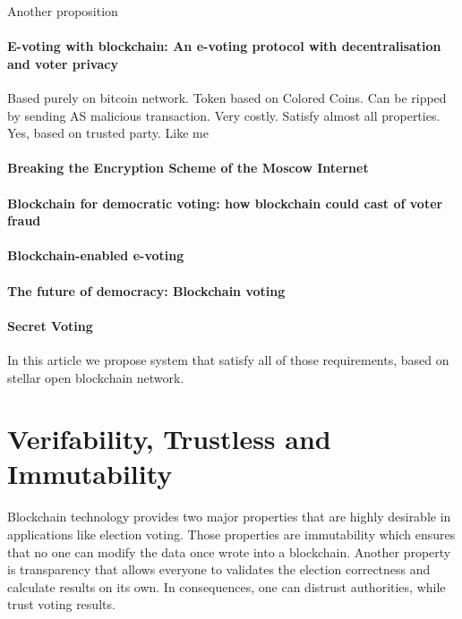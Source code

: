 \documentclass[runningheads]{llncs}
\begin{document}
Another  proposition 
\paragraph{E-voting with blockchain: An e-voting protocol with decentralisation and voter privacy ~\cite{hardwick2018voting} }
Based purely on bitcoin network. Token based on Colored Coins. Can be ripped by sending AS malicious transaction. Very costly. Satisfy almost all properties. Yes, based on trusted party. Like me

\paragraph{Breaking the Encryption Scheme of the Moscow Internet ~\cite{gaudry2019breaking} }




\paragraph{Blockchain for democratic voting: how blockchain could cast of voter fraud ~\cite{casado2018blockchain} }

\paragraph{Blockchain-enabled e-voting ~\cite{kshetri2018blockchain} }

\paragraph{The future of democracy: Blockchain voting ~\cite{osgood2016future}}

\paragraph{Secret Voting ~\cite{tam_2018} }


In this article we propose system that satisfy all of those requirements, based on stellar open blockchain network.



\section{Verifability, Trustless and Immutability}
 Blockchain technology provides two major properties that are highly desirable in applications like election voting. Those properties are immutability which ensures that no one can modify the data once wrote into a blockchain. Another property is transparency that allows everyone to validates the election correctness and calculate results on its own. In consequences, one can distrust authorities, while trust voting results. 
\end{document}
